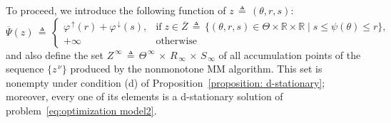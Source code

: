 \documentclass{siamart}
\begin{document}
To proceed, we introduce the following function of $z \,\triangleq\, (\theta, r,s)$:
$$
\overline\Psi(z) \,\triangleq\,
\left\{\begin{array}{ll}
\varphi^{\,\uparrow}(r) + \varphi^{\,\downarrow}(s), & \mbox{if}\; z\in \overline{Z}\,\triangleq\,\{(\theta, r, s)\in \Theta\times \mathbb{R}\times \mathbb{R}\mid
s\leq \psi({\theta})\leq r\}, \\[0.05in]
+\infty & \mbox{otherwise}
\end{array}\right.
$$
and also define the set
$Z^{\,\infty} \, \triangleq \, \Theta^{\,\infty} \, \times \, R_{\,\infty} \, \times \, S_{\,\infty}$
of all accumulation points of the sequence $\{ z^{\,\nu} \}$ produced by the nonmonotone MM algorithm.  This set is nonempty under condition (d)
of Proposition~\ref{proposition: d-stationary}; moreover, every one of its elements is a d-stationary solution of
problem~\eqref{eq:optimization model2}.
\end{document}
